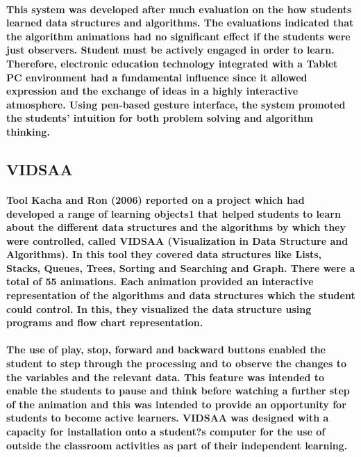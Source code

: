 \documentclass{article}
\begin{document}
\paragraph{This system was developed after much evaluation on the how students learned data structures and algorithms. The evaluations indicated that the algorithm animations had no significant effect if the students were just observers. Student must be actively engaged in order to learn. Therefore, electronic education technology integrated with a Tablet PC environment had a fundamental influence since it allowed expression and the exchange of ideas in a highly interactive atmosphere. Using pen-based gesture interface, the system promoted the students' intuition for both problem solving and algorithm thinking\cite{myller2009extending}. }
\newpage
\subsection{VIDSAA}
\paragraph{\cite{patel2014literature}Tool Kacha and Ron (2006) reported on a project which had developed a range of learning objects1 that helped students to learn about the different data structures and the algorithms by which they were controlled, called VIDSAA (Visualization in Data Structure and Algorithms). In this tool they covered data structures like Lists, Stacks, Queues, Trees, Sorting and Searching and Graph. There were a total of 55 animations. Each animation provided an interactive representation of the algorithms and data structures which the student could control. In this, they visualized the data structure using programs and flow chart representation.}


\paragraph{The use of play, stop, forward and backward buttons enabled the student to step through the processing and to observe the changes to the variables and the relevant data. This feature was intended to enable the students to pause and think before watching a further step of the animation and this was intended to provide an opportunity for students to become active learners. VIDSAA was designed with a capacity for installation onto a student?s computer for the use of outside the classroom activities as part of their independent learning.}
\end{document}
